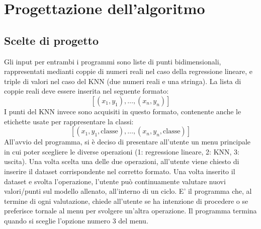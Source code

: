\documentclass[11pt]{article}
\theoremstyle{definition}
\begin{document}
\newpage

\section{Progettazione dell'algoritmo}

\subsection{Scelte di progetto}
Gli input per entrambi i programmi sono liste di punti bidimensionali, rappresentati medianti coppie di numeri reali nel caso della regressione lineare, e triple di valori nel caso del KNN (due numeri reali e una stringa). La lista di coppie reali deve essere inserita nel seguente formato:
$$
[(x_1, y_1), \dots, (x_n, y_n)]
$$
I punti del KNN invece sono acquisiti in questo formato, contenente anche le etichette usate per rappresentare la classi:
$$
[(x_1, y_1, \text{classe}), \dots, (x_n, y_n, \text{classe})]
$$
All'avvio del programma, si è deciso di presentare all'utente un menu principale in cui poter scegliere le diverse operazioni (1: regressione lineare, 2: KNN, 3: uscita). Una volta scelta una delle due operazioni, all'utente viene chiesto di inserire il dataset corrispondente nel corretto formato. Una volta inserito il dataset e svolta l'operazione, l'utente può continuamente valutare nuovi valori/punti sul modello allenato, all'interno di un ciclo. E' il programma che, al termine di ogni valutazione, chiede all'utente se ha intenzione di procedere o se preferisce tornale al menu per svolgere un'altra operazione. Il programma termina quando si sceglie l'opzione numero 3 del menu.
\end{document}
